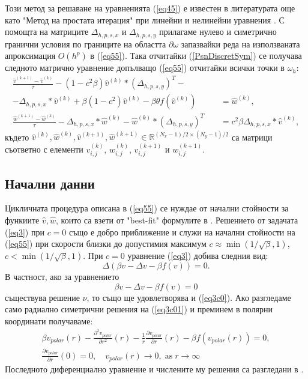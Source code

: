 \documentclass{article}
\newcommand{\be}{\begin{equation}}
\newcommand{\ee}{\end{equation}}
\newcommand{\rf}[1]{(\ref{#1})}
\newcommand{\RR}{\mathbb{R}}
\begin{document}
Този метод за решаване на уравненията \rf{eq45} е известен в литературата още като "Метод на простата итерация" при линейни и нелинейни уравнения \cite{sam}. С помощта на матриците $\Delta_{h,p,s,x}$ и $\Delta_{h,p,s,y}$ прилагаме нулево и симетрично гранични условия по границите на областта $\partial \omega$ запазвайки реда на използваната апроксимация $O(h^p)$ в \rf{eq55}. Така отчитайки \rf{PsnDiscretSym} се получава следното матрично уравнение допълващо \rf{eq55} отчитайки всички точки в $\omega_h$:
\begin{equation}\label{eq555}
\begin{split}
\frac {\widehat{v}^{(k+1)}-\widehat{v}^{(k)}}{\tau}- (1-c^2 \beta) \widehat{v}^{(k)} * (\Delta_{h,p,s,y})^T - \quad\quad\quad\;&\\
-\Delta_{h,p,s,x} * \widehat{v}^{(k)}+ \beta (1-c^2 ) \widehat{v}^{(k)} - \beta \theta f(\widehat{v}^{(k)}) &= \widehat{w}^{(k)}, \\
\frac  {\widehat{w}^{(k+1)} -\widehat{w}^{(k)}} {\tau} - \Delta_{h,p,s,x} * \widehat{w}^{(k)} - \widehat{w}^{(k)} * (\Delta_{h,p,s,y})^T &=  c^2 \beta \Delta_{h,p,s,x} * \widehat{v}^{(k)},
\end{split}
\end{equation}
където $\widehat{v}^{(k)}, \widehat{w}^{(k)}, \widehat{v}^{(k+1)}, \widehat{w}^{(k+1)} \in \RR^{(N_x-1)/2 \times (N_y-1)/2}$ са матрици съответно с елементи ${v}_{i,j}^{(k)}$, ${w}_{i,j}^{(k)}$, ${v}_{i,j}^{(k+1)}$ и ${w}_{i,j}^{(k+1)}$.
\subsection{Начални данни}
 Цикличната процедура описана в \rf{eq55} се нуждае от начални стойности за функиите $\widehat{v},\widehat{w}$, които са взети от "best-fit" формулите в \cite{Ch2011}. 
Решението от задачата \rf{eq3} при $c=0$ също е добро приближение и служи на начални стойности на \rf{eq55} при скорости близки до допустимия максимум $c \approx \min (1/ \sqrt{\beta},1)$, $c < \min (1/ \sqrt{\beta},1)$. При $c=0$ уравнение \rf{eq3} добива следния вид:
\be\label{eq3c0}
\Delta (\beta  v - \Delta v - \beta f(v)) = 0.
\ee
В частност, ако за уравнението 
\be\label{eq3c01}
\beta v - \Delta v - \beta f(v) = 0
\ee
съществува решение $\nu$, то също ще удовлетворява и \rf{eq3c0}. Ако разгледаме само радиално симетрични решения на \rf{eq3c01} и преминем в полярни координати получаваме:
\begin{align}\label{eq3c02}
\beta v_{polar}(r)  - \frac{ \partial^2 v_{polar} } {\partial r^2}(r) - \frac{1}{r} \frac{ \partial v_{polar} } {\partial r}(r)  - \beta f(v_{polar}(r)) = 0, \nonumber \\
\frac{ \partial v_{polar} } {\partial r}(0) = 0, \quad v_{polar}(r) \rightarrow 0, \; \text{as} \; r \rightarrow \infty
\end{align}
Последното диференциално уравнение и числените му решения са разгледани в \cite{ref1c0, ref2c0}.
\end{document}
